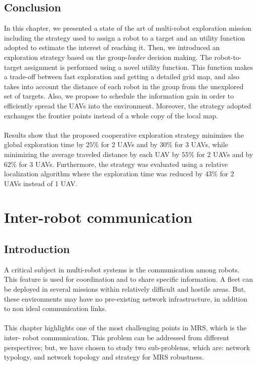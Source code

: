 \documentclass[11pt,openany]{book}
\begin{document}
\section{Conclusion}
In this chapter, we presented a state of the art of multi-robot exploration mission including the strategy used to assign a robot to a target and an utility function adopted to estimate the interest of reaching it. Then, we introduced an exploration strategy based on the group-\textit{leader} decision making. The robot-to-target assignment is performed using a novel utility function. This function makes a trade-oﬀ between fast exploration and getting a detailed grid map, and also takes into account the distance of each robot in the group from the unexplored set of targets. Also, we propose to schedule the information gain in order to eﬃciently spread the UAVs into the environment. Moreover, the strategy adopted exchanges the frontier points instead of a whole copy of the local map.\\\\
Results show that the proposed cooperative exploration strategy minimizes the global exploration time by $25\%$ for 2 UAVs and by $30\%$ for 3 UAVs, while minimizing the average traveled distance by each UAV by $55\%$ for 2 UAVs and by $62\%$ for 3 UAVs. Furthermore, the strategy was evaluated using a relative localization algorithm where the exploration time was reduced by $43\%$ for 2 UAVs instead of 1 UAV.
\chapter{Inter-robot communication}
\section{Introduction}
A critical subject in multi-robot systems is the communication among robots. This feature is used for coordination and to share speciﬁc information. A ﬂeet can be deployed in several missions within relatively diﬃcult and hostile areas. But, these environments may have no pre-existing network infrastructure, in addition to non ideal communication links.\\\\
This chapter highlights one of the most challenging points in MRS, which is the inter- robot communication. This problem can be addressed from diﬀerent perspectives; but, we have chosen to study two sub-problems, which are: network typology, and network topology and strategy for MRS robustness.
\end{document}
